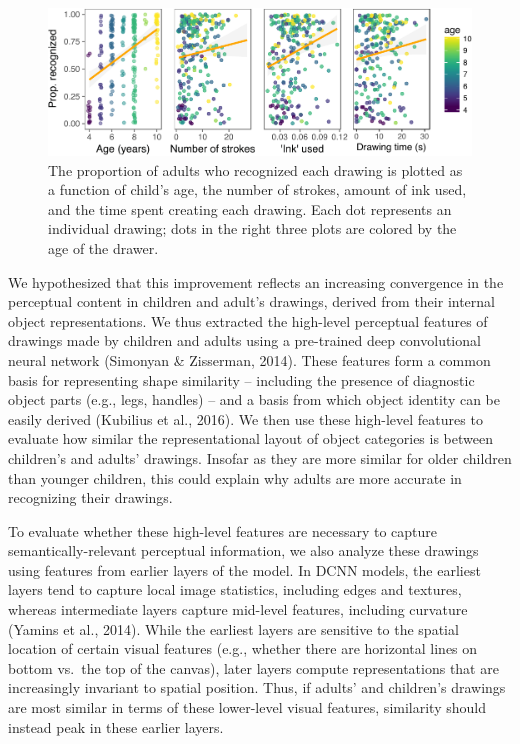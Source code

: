 \documentclass[10pt, letterpaper]{article}
\newenvironment{CodeChunk}{}{}
\begin{document}
\begin{CodeChunk}
\begin{figure}[h]

{\centering \includegraphics{figs/covDescriptives-1} 

}

\caption[The proportion of adults who recognized each drawing is plotted as a function of child's age, the number of strokes, amount of ink used, and the time spent creating each drawing]{The proportion of adults who recognized each drawing is plotted as a function of child's age, the number of strokes, amount of ink used, and the time spent creating each drawing. Each dot represents an individual drawing; dots in the right three plots are colored by the age of the drawer.}\label{fig:covDescriptives}
\end{figure}
\end{CodeChunk}

We hypothesized that this improvement reflects an increasing convergence
in the perceptual content in children and adult's drawings, derived from
their internal object representations. We thus extracted the high-level
perceptual features of drawings made by children and adults using a
pre-trained deep convolutional neural network (Simonyan \& Zisserman,
2014). These features form a common basis for representing shape
similarity -- including the presence of diagnostic object parts (e.g.,
legs, handles) -- and a basis from which object identity can be easily
derived (Kubilius et al., 2016). We then use these high-level features
to evaluate how similar the representational layout of object categories
is between children's and adults' drawings. Insofar as they are more
similar for older children than younger children, this could explain why
adults are more accurate in recognizing their drawings.

To evaluate whether these high-level features are necessary to capture
semantically-relevant perceptual information, we also analyze these
drawings using features from earlier layers of the model. In DCNN
models, the earliest layers tend to capture local image statistics,
including edges and textures, whereas intermediate layers capture
mid-level features, including curvature (Yamins et al., 2014). While the
earliest layers are sensitive to the spatial location of certain visual
features (e.g., whether there are horizontal lines on bottom vs.~the top
of the canvas), later layers compute representations that are
increasingly invariant to spatial position. Thus, if adults' and
children's drawings are most similar in terms of these lower-level
visual features, similarity should instead peak in these earlier layers.
\end{document}
